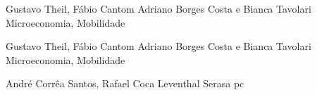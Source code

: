 \documentclass[10pt, a4paper]{article}
\begin{document}
\tableofcontents

    {Gustavo Theil, Fábio Cantom}
    {Adriano Borges Costa e Bianca Tavolari}
    {\lipsum[1-1]}
    {Microeconomia, Mobilidade}




    {Gustavo Theil, Fábio Cantom}
    {Adriano Borges Costa e Bianca Tavolari}
    {\lipsum[1-1]}
    {Microeconomia, Mobilidade}




    {André Corrêa Santos, Rafael Coca Leventhal}
    {Serasa}
    {\lipsum[1-1]}
    {pc}




\appendix
\end{document}
